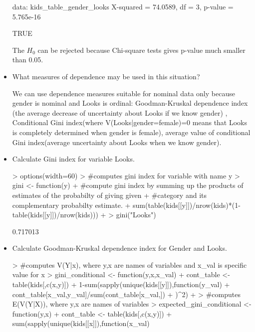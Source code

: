 \documentclass[a4paper]{article}
\begin{document}
\begin{itemize}
\begin{Schunk}
\begin{Soutput}
data:  kids_table_gender_looks
X-squared = 74.0589, df = 3, p-value = 5.765e-16
\end{Soutput}
\begin{Soutput}
[1] TRUE
\end{Soutput}
\end{Schunk}
The $H_0$ can be rejected because Chi-square tests gives p-value much smaller than 0.05.
\item What measures of dependence may be used in this situation?

We can use dependence measures suitable for nominal data only because gender is nominal and Looks is ordinal: Goodman-Kruskal dependence index (the average decrease of uncertainty about Looks if we know gender) , Conditional Gini index(where V(Looks|gender=female)=0 means that Looks is completely determined when gender is female), average value of conditional Gini index(average uncertainty about Looks when we know gender).
\item Calculate Gini index for variable Looks.
\begin{Schunk}
\begin{Sinput}
> options(width=60)
> #computes gini index for variable with name y
> gini <- function(y){
+   #compute gini index by summing up the products of estimates of the probabilty of giving given 
+   #category and its complementary probabilty estimate.
+   sum(table(kids[[y]])/nrow(kids)*(1-table(kids[[y]])/nrow(kids)))
+ }
> gini("Looks")
\end{Sinput}
\begin{Soutput}
[1] 0.717013
\end{Soutput}
\end{Schunk}
\item Calculate Goodman-Kruskal dependence index for Gender and Looks.
\begin{Schunk}
\begin{Sinput}
> #computes V(Y|x), where y,x are names of variables and x_val is specific value for x
> gini_conditional <- function(y,x,x_val){
+   cont_table <- table(kids[,c(x,y)])
+   1-sum(sapply(unique(kids[[y]]),function(y_val){
+     cont_table[x_val,y_val]/sum(cont_table[x_val,]) 
+   })^2)
+ }
> #computes E(V(Y|X)), where y,x are names of variables
> expected_gini_conditional <- function(y,x){
+   cont_table <- table(kids[,c(x,y)])
+   sum(sapply(unique(kids[[x]]),function(x_val){
}}
\end{Sinput}
\end{Schunk}
\end{itemize}
\end{document}
